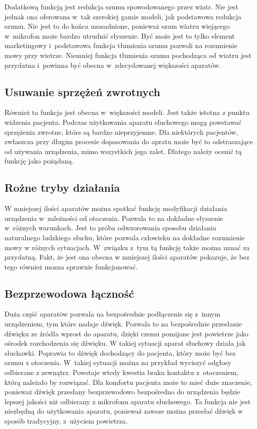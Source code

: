 \documentclass[journal]{IEEEtran}
\begin{document}
Dodatkową funkcją jest redukcja szumu spowodowanego przez wiatr. Nie jest jednak ona oferowana w~tak szerokiej gamie modeli, jak podstawowa redukcja szumu. Nie jest to do końca uzasadnione, ponieważ szum wiatru wiejącego w~mikrofon może bardzo utrudnić słyszenie. Być może jest to tylko element marketingowy i~podstawowa funkcja tłumienia szumu pozwoli na rozumienie mowy przy wietrze. Niemniej funkcja tłumienia szumu pochodząca od wiatru jest przydatna i~powinna być obecna w~zdecydowanej większości aparatów.

\subsection{Usuwanie sprzężeń zwrotnych}

Również ta funkcja jest obecna w~większości modeli. Jest także istotna z punktu widzenia pacjenta. Podczas użytkowania aparatu słuchowego mogą powstawać sprzężenia zwrotne, które są bardzo nieprzyjemne. Dla niektórych pacjentów, zwłaszcza przy długim procesie dopasowania do apratu może być to odstraszające od używania urządzenia, mimo wszystkich jego zalet. Dlatego należy ocenić tą funkcję jako pożądaną. 

\subsection{Rożne tryby działania}

W mniejszej ilości aparatów można spotkać funkcję modyfikacji działania urządzenia w~zależności od otoczenia. Pozwala to na dokładne słyszenie w~różnych warunkach. Jest to próba odwzorowania sposobu działania naturalnego ludzkiego słuchu, które pozwala człowieku na dokładne rozumienie mowy w różnych sytuacjach. W~związku z~tym tą funkcję także można uznać za przydatną. Fakt, że jest ona obecna w mniejszej ilości aparatów pokazuje, że bez tego również mozna sprawnie funkcjonować.

\subsection{Bezprzewodowa łączność}

Duża część aparatów pozwala na bezpośrednie podłączenie się z~innym urządzeniem, tym które nadaje dźwięk. Pozwala to na bezpośrednie przesłanie dźwięku ze źródła wprost do aparatu, dzięki czemu pomijane jest powietrze jako ośrodek rozchodzenia się dźwięku. W takiej sytuacji aparat słuchowy działa jak słuchawki. Poprawia to dźwięk dochodzący do pacjenta, który może być bez szumu z otoczenia. W~takiej sytuacji można na przykład wyciszyć odgłosy odbierane z zewnątrz. Powstaje wtedy kwestia braku kontaktu z~otoczeniem, którą należało by rozwiązać. Dla komfortu pacjenta może to mieć duże znaczenie, ponieważ dźwięk przesłany bezprzewodowo bezpośredno do urządzenia będzie lepszej jakości niż odbierany z mikrofonu aparatu słuchowego.
Ta funkcja nie jest niezbędną do użytkowania aparatu, ponieważ zawsze można przesłać dźwięk w sposób tradycyjny, z~użyciem powietrza.
\end{document}
